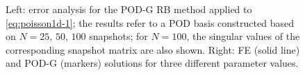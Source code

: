 \documentclass[12pt, a4paper, twoside, openright, notitlepage]{report}
\numberwithin{equation}{chapter}
\theoremstyle{theorem}
\theoremstyle{definition}
\theoremstyle{remark}
\theoremstyle{proposition}
\numberwithin{figure}{chapter}
\begin{document}
\begin{figure}[b!]
			
			\vspace*{-0.2cm}
			
			\caption{Left: error analysis for the POD-G RB method applied to \eqref{eq:poisson1d-1}; the results refer to a POD basis constructed based on $N = 25$, $50$, $100$ snapshots; for $N = 100$, the singular values of the corresponding snapshot matrix are also shown. Right: FE (solid line) and POD-G (markers) solutions for three different parameter values.}
			\label{fig:poisson1d-1-fig1}
		\end{figure}
	
\end{document}
